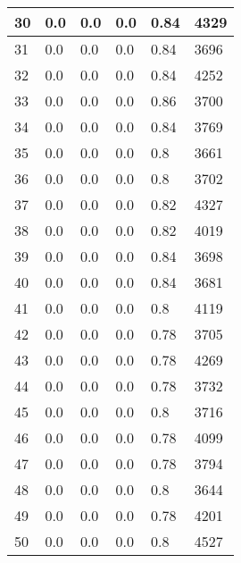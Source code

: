 \begin{longtable}{|l|l|l|l|l|l|}
30 & 0.0 & 0.0 & 0.0 & 0.84 & 4329 \\ \hline 
31 & 0.0 & 0.0 & 0.0 & 0.84 & 3696 \\ \hline 
32 & 0.0 & 0.0 & 0.0 & 0.84 & 4252 \\ \hline 
33 & 0.0 & 0.0 & 0.0 & 0.86 & 3700 \\ \hline 
34 & 0.0 & 0.0 & 0.0 & 0.84 & 3769 \\ \hline 
35 & 0.0 & 0.0 & 0.0 & 0.8 & 3661 \\ \hline 
36 & 0.0 & 0.0 & 0.0 & 0.8 & 3702 \\ \hline 
37 & 0.0 & 0.0 & 0.0 & 0.82 & 4327 \\ \hline 
38 & 0.0 & 0.0 & 0.0 & 0.82 & 4019 \\ \hline 
39 & 0.0 & 0.0 & 0.0 & 0.84 & 3698 \\ \hline 
40 & 0.0 & 0.0 & 0.0 & 0.84 & 3681 \\ \hline 
41 & 0.0 & 0.0 & 0.0 & 0.8 & 4119 \\ \hline 
42 & 0.0 & 0.0 & 0.0 & 0.78 & 3705 \\ \hline 
43 & 0.0 & 0.0 & 0.0 & 0.78 & 4269 \\ \hline 
44 & 0.0 & 0.0 & 0.0 & 0.78 & 3732 \\ \hline 
45 & 0.0 & 0.0 & 0.0 & 0.8 & 3716 \\ \hline 
46 & 0.0 & 0.0 & 0.0 & 0.78 & 4099 \\ \hline 
47 & 0.0 & 0.0 & 0.0 & 0.78 & 3794 \\ \hline 
48 & 0.0 & 0.0 & 0.0 & 0.8 & 3644 \\ \hline 
49 & 0.0 & 0.0 & 0.0 & 0.78 & 4201 \\ \hline 
50 & 0.0 & 0.0 & 0.0 & 0.8 & 4527 \\ \hline 
\end{longtable}